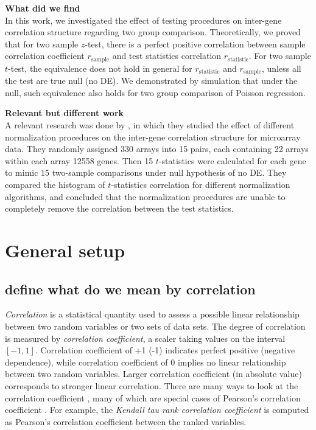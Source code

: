 \documentclass[12pt, a4paper]{article}
\begin{document}
	
		\textbf{What did we find}\\
		In this work, we investigated the effect of testing procedures on inter-gene correlation structure
		regarding two group comparison. Theoretically, we proved that for two sample $z$-test, there is a
		perfect positive correlation between sample correlation coefficient $r_{\text{sample}}$ and test
		statistics correlation $r_{\text{statistic}}$. For two sample $t$-test, the equivalence does not
		hold in general for $r_{\text{statistic}}$ and $r_{\text{sample}}$, unless all the test are true
		null (no DE).  We demonstrated by simulation that under the null, such equivalence also holds for
		two group comparison of Poisson regression. 
		
		
	
	\textbf{Relevant but different work}\\
	A relevant research was done by \citet{qiu2005effects}, in which they studied the effect of different
	normalization procedures on the inter-gene correlation structure for microarray data. They randomly
	assigned 330 arrays into 15 pairs, each containing 22 arrays within each array 12558 genes. Then 15
	$t$-statistics were calculated for each gene to mimic 15 two-sample comparisons under null
	hypothesis of no DE. They compared the histogram of $t$-statistics correlation for different
	normalization algorithms, and concluded that the normalization procedures are unable to completely
	remove the correlation between the test statistics. %
	

	
	
	
	
	
	\section{General setup}
	
	\subsection{define what do we mean by correlation}
	\textit{Correlation} is a statistical quantity used to assess a possible linear relationship between two random variables or two sets of 
	data sets. The degree of correlation is measured by \textit{correlation coefficient}, a scaler taking values on the interval $[-1, 1]$. 
	Correlation coefficient of +1 (-1) indicates perfect positive (negative dependence), while correlation coefficient of 0 implies no linear 
	relationship between two random variables. Larger correlation coefficient (in absolute value) corresponds to stronger linear correlation. 
	There are many ways to look at the correlation coefficient , many of which are special cases of Pearson's correlation coefficient 
	\citep{lee1988thirteen}. For example, the \textit{Kendall tau rank correlation coefficient} is computed as Pearson's correlation coefficient 
	between the ranked variables.
	
\end{document}
